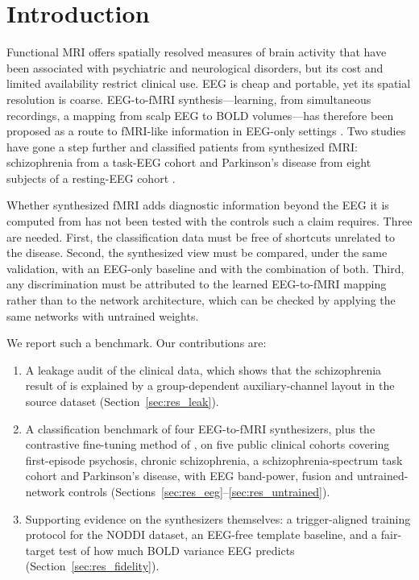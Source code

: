 \documentclass[11pt]{article}
\begin{document}
\section{Introduction}

Functional MRI offers spatially resolved measures of brain activity that have been associated with psychiatric and neurological disorders, but its cost and limited availability restrict clinical use.
EEG is cheap and portable, yet its spatial resolution is coarse.
EEG-to-fMRI synthesis---learning, from simultaneous recordings, a mapping from scalp EEG to BOLD volumes---has therefore been proposed as a route to fMRI-like information in EEG-only settings \citep{calhas2023mlhc,roos2025e2fnet,he2025spec2vol,lanzino2024ntvit,li2024neurobolt}.
Two studies have gone a step further and classified patients from synthesized fMRI: schizophrenia from a task-EEG cohort \citep{calhas2023medrxiv} and Parkinson's disease from eight subjects of a resting-EEG cohort \citep{yao2025catd}.

Whether synthesized fMRI adds diagnostic information beyond the EEG it is computed from has not been tested with the controls such a claim requires.
Three are needed.
First, the classification data must be free of shortcuts unrelated to the disease.
Second, the synthesized view must be compared, under the same validation, with an EEG-only baseline and with the combination of both.
Third, any discrimination must be attributed to the learned EEG-to-fMRI mapping rather than to the network architecture, which can be checked by applying the same networks with untrained weights.

We report such a benchmark.
Our contributions are:
\begin{enumerate}
\item A leakage audit of the clinical data, which shows that the schizophrenia result of \citet{calhas2023medrxiv} is explained by a group-dependent auxiliary-channel layout in the source dataset (Section~\ref{sec:res_leak}).
\item A classification benchmark of four EEG-to-fMRI synthesizers, plus the contrastive fine-tuning method of \citet{calhas2023medrxiv}, on five public clinical cohorts covering first-episode psychosis, chronic schizophrenia, a schizophrenia-spectrum task cohort and Parkinson's disease, with EEG band-power, fusion and untrained-network controls (Sections~\ref{sec:res_eeg}--\ref{sec:res_untrained}).
\item Supporting evidence on the synthesizers themselves: a trigger-aligned training protocol for the NODDI dataset, an EEG-free template baseline, and a fair-target test of how much BOLD variance EEG predicts (Section~\ref{sec:res_fidelity}).
\end{enumerate}
\end{document}
